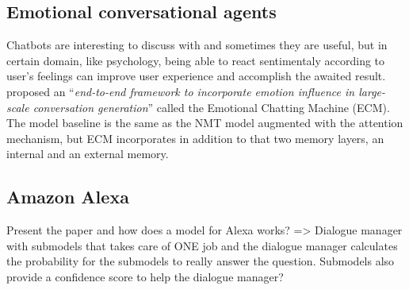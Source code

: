 \subsection{Emotional conversational agents}
Chatbots are interesting to discuss with and sometimes they are useful, but in certain domain, like psychology, being able to react sentimentaly according to user's feelings can improve user experience and accomplish the awaited result. \citet{ecm-1704.01074} proposed an ``\textit{end-to-end framework to incorporate emotion influence in large-scale conversation generation}'' called the Emotional Chatting Machine (ECM). The model baseline is the same as the NMT model augmented with the attention mechanism, but ECM incorporates in addition to that two memory layers, an internal and an external memory.  


\subsection{Amazon Alexa}
Present the paper and how does a model for Alexa works? => Dialogue manager with submodels that takes care of ONE job and the dialogue manager calculates the probability for the submodels to really answer the question. Submodels also provide a confidence score to help the dialogue manager?
